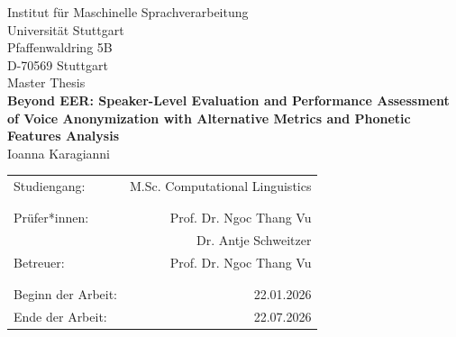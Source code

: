 \documentclass[12pt,leqno,a4paper]{article}
\newcommand{\Titel}{Beyond EER: Speaker-Level Evaluation and
Performance Assessment of Voice Anonymization
with Alternative Metrics and Phonetic Features
Analysis}
\begin{document}

\begin{titlepage}
  \large
   \begin{center}
    Institut für Maschinelle Sprachverarbeitung\\
    Universität Stuttgart\\
    Pfaffenwaldring 5B\\
    D-70569 Stuttgart\\    
    
    \vspace{2.5cm}
    Master Thesis \\
    {\LARGE \bf \Titel} \\
    \vspace{2cm}
    Ioanna Karagianni\\
       \vfill
    \begin{tabular}[t]{lr}
    Studiengang: & M.Sc. Computational Linguistics \\ %
    \\
    \\
    {Prüfer*innen:} & Prof. Dr. Ngoc Thang Vu\\
                    & Dr. Antje Schweitzer\\
     
    {Betreuer:} & Prof. Dr. Ngoc Thang Vu \\ 
    \\
    \\
    {Beginn der Arbeit:} & 22.01.2026\\
    {Ende der Arbeit:} & 22.07.2026\\
    \end{tabular}
  \end{center}
\setlength{\hoffset}{0cm}

  \normalsize
\end{titlepage}


\newpage
\thispagestyle{empty}

\end{document}
